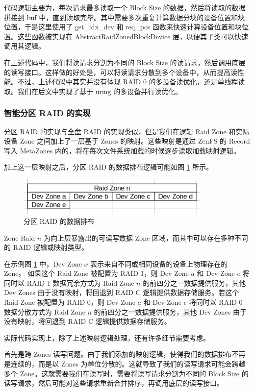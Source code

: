 代码逻辑主要为，每次请求最多读取一个 Block Size 的数据，然后将读取的数据拼接到 buf 中，直到读取完毕。其中需要多次重复计算数据分块的设备位置和块位置，于是这里使用了 get\_idx\_dev 和 req\_pos 函数来快速计算设备位置和块位置。这些函数被实现在 AbstractRaidZonedBlockDevice 层，以便其子类可以快速调用其逻辑。

在上述代码中，我们将读请求分割为不同的 Block Size 的读请求，然后调用底层的读写接口。这样做的好处是，可以将读请求分散到多个设备中，从而提高读性能。不过，上述代码中其实并没有体现 RAID 0 的多设备读优化，还是单线程读取。我们在后文中实现了基于 uring 的多设备并行读优化。

\subsubsection{智能分区 RAID 的实现}

分区 RAID 的实现与全盘 RAID 的实现类似，但是我们在逻辑 Raid Zone 和实际设备 Zone 之间加上了一层基于 Zones 的映射。这些映射是通过 ZenFS 的 Record 写入 MetaZones 内的，将在每次文件系统加载的时候逐步读取加载映射逻辑。

加上这一层映射之后，分区 RAID 的数据排布逻辑可能如图 \ref{raid-a} 所示。

\begin{figure}[htbp]
  \centering
  \includegraphics[width=0.85\textwidth]{fig/raid-a}
  \caption{ 分区 RAID 的数据排布 }
  \label{raid-a}
\end{figure}

Zone Raid $n$ 为向上层暴露出的可读写数据 Zone 区域，而其中可以存在多种不同的 RAID 逻辑或映射类型。

在示例图 \ref{raid-a} 中，Dev Zone $x$ 表示来自不同或相同设备的设备上物理存在的 Zone。
如果这个 Raid Zone 被配置为 RAID 1，则 Dev Zone $a$ 和 Dev Zone $e$ 将同时以 RAID 1 数据冗余方式为 Raid Zone $n$ 的前四分之一数据提供服务，其他 Dev Zones 由于没有映射，将回退到 RAID C 逻辑提供数据存储服务。若这个 Raid Zone 被配置为 RAID 0，则 Dev Zone $a$ 和 Dev Zone $e$ 将同时以 RAID 0 数据分散方式为 Raid Zone $n$ 的前四分之一数据提供服务，其他 Dev Zones 由于没有映射，将回退到 RAID C 逻辑提供数据存储服务。

实际代码实现上，除了上述映射逻辑处理，还有许多细节需要考虑。

首先是跨 Zones 读写问题。由于我们添加的映射逻辑，使得我们的数据排布不再是连续的，而是以 Zones 为单位分散的。这就导致了我们的读写请求可能会跨越多个 Zone。这就需要我们在读写时，需要将读写请求分割为不同的 Block Size 的读写请求，然后可能对这些请求重新合并排序，再调用底层的读写接口。

